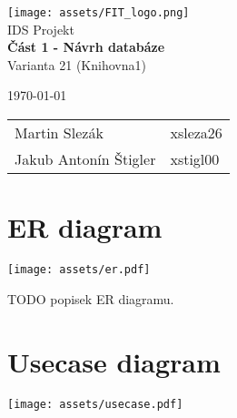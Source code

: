 \documentclass{article}
\begin{document}
\begin{titlepage}
    \begin{center}
        \texttt{[image: assets/FIT\_logo.png]} \\
        \Huge{IDS Projekt} \\
        \Large{\textbf{Část 1 - Návrh databáze}} \\
        \large{Varianta 21 (Knihovna1)}
    \end{center}
    \vfill
    {
        \large \today \hfill
        \large
        \begin{tabular}{l l}
            Martin Slezák          & \quad xsleza26 \\
            Jakub Antonín Štigler  & \quad xstigl00 \\
        \end{tabular}
    }
\end{titlepage}

\section*{ER diagram}

\texttt{[image: assets/er.pdf]}

TODO popisek ER diagramu.

\newpage

\section*{Usecase diagram}

\begin{center}
    \texttt{[image: assets/usecase.pdf]}
\end{center}
\end{document}
